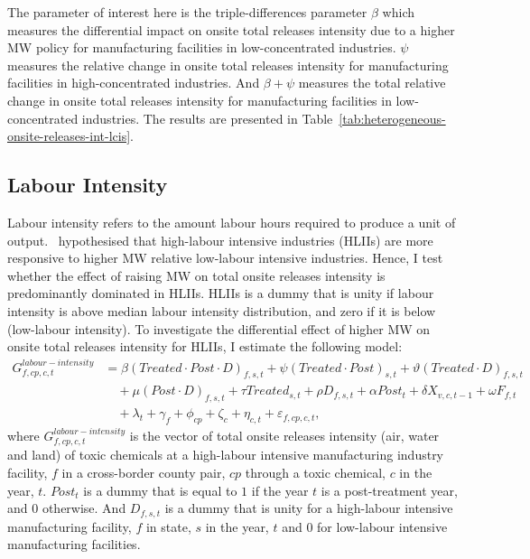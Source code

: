 \documentclass[12pt, english]{article}
\begin{document}
    The parameter of interest here is the triple-differences parameter $\beta$ which measures the differential impact on onsite total releases intensity due to a higher MW policy for manufacturing facilities in low-concentrated industries. $\psi$ measures the relative change in onsite total releases intensity for manufacturing facilities in high-concentrated industries. And $\beta + \psi$ measures the total relative change in onsite total releases intensity for manufacturing facilities in low-concentrated industries. The results are presented in Table~\ref{tab:heterogeneous-onsite-releases-int-lcis}.
    

    \subsection{Labour Intensity}\label{subsec:labour-intensity}
    Labour intensity refers to the amount labour hours required to produce a unit of output.~\cite{zhang2023unintended} hypothesised that high-labour intensive industries (HLIIs) are more responsive to higher MW relative low-labour intensive industries. Hence, I test whether the effect of raising MW on total onsite releases intensity is predominantly dominated in HLIIs. HLIIs is a dummy that is unity if labour intensity is above median labour intensity distribution, and zero if it is below (low-labour intensity). To investigate the differential effect of higher MW on onsite total releases intensity for HLIIs, I estimate the following model:
    \begin{align}
        G_{f,cp,c,t}^{labour-intensity} &= \beta (Treated \cdot Post \cdot D)_{f,s,t} + \psi (Treated \cdot Post)_{s,t} + \vartheta (Treated \cdot D)_{f,s,t} \nonumber \\
        &\quad + \mu (Post \cdot D)_{f,s,t} + \tau Treated_{s,t} + \rho D_{f,s,t} + \alpha Post_{t} + \delta X_{v,c,t-1} + \omega F_{f,t} \nonumber \\
        &\quad + \lambda_{t} + \gamma_{f} + \phi_{cp} + \zeta_{c} + \eta_{c,t} + \varepsilon_{f,cp,c,t},\label{eq:heterogeneous-onsite-releases-intensity-liis}
    \end{align}
    where $G_{f,cp,c,t}^{labour-intensity}$ is the vector of total onsite releases intensity (air, water and land) of toxic chemicals at a high-labour intensive manufacturing industry facility, $f$ in a cross-border county pair, $cp$ through a toxic chemical, $c$ in the year, $t$. $Post_{t}$ is a dummy that is equal to $1$ if the year $t$ is a post-treatment year, and $0$ otherwise. And $D_{f,s,t}$ is a dummy that is unity for a high-labour intensive manufacturing facility, $f$ in state, $s$ in the year, $t$ and $0$ for low-labour intensive manufacturing facilities.
    
\end{document}

